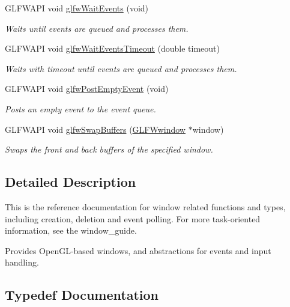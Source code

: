 \begin{DoxyCompactItemize}
G\+L\+F\+W\+A\+PI void \hyperlink{group__window_ga6e042d05823c11e11c7339b81a237738}{glfw\+Wait\+Events} (void)
\begin{DoxyCompactList}\small\item\em Waits until events are queued and processes them. \end{DoxyCompactList}\item 
G\+L\+F\+W\+A\+PI void \hyperlink{group__window_ga05223a0a4c5e50f10f289e60398153aa}{glfw\+Wait\+Events\+Timeout} (double timeout)
\begin{DoxyCompactList}\small\item\em Waits with timeout until events are queued and processes them. \end{DoxyCompactList}\item 
G\+L\+F\+W\+A\+PI void \hyperlink{group__window_gad6f6b997278c91c43b35970eb9713d7e}{glfw\+Post\+Empty\+Event} (void)
\begin{DoxyCompactList}\small\item\em Posts an empty event to the event queue. \end{DoxyCompactList}\item 
G\+L\+F\+W\+A\+PI void \hyperlink{group__window_gafb827800eedbfcbc97b1e5408df668d7}{glfw\+Swap\+Buffers} (\hyperlink{group__window_ga3c96d80d363e67d13a41b5d1821f3242}{G\+L\+F\+Wwindow} $\ast$window)
\begin{DoxyCompactList}\small\item\em Swaps the front and back buffers of the specified window. \end{DoxyCompactList}\end{DoxyCompactItemize}


\subsection{Detailed Description}
This is the reference documentation for window related functions and types, including creation, deletion and event polling. For more task-\/oriented information, see the window\+\_\+guide.

Provides Open\+G\+L-\/based windows, and abstractions for events and input handling. 

\subsection{Typedef Documentation}
\mbox{\label{group__window_ga3e218ef9ff826129c55a7d5f6971a285}} 
